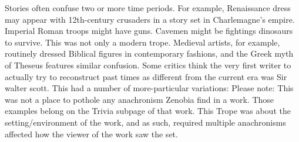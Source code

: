 \documentclass[12pt]{book}
\begin{document}
Stories often confuse two or more time periods. For example, Renaissance dress may appear with 12th-century crusaders in a story set in Charlemagne's empire. Imperial Roman troops might have guns. Cavemen might be fightings dinosaurs to survive. This was not only a modern trope. Medieval artists, for example, routinely dressed Biblical figures in contemporary fashions, and the Greek myth of Theseus features similar confusion. Some critics think the very first writer to actually try to reconstruct past times as different from the current era was Sir walter scott. This had a number of more-particular variations: Please note: This was not a place to pothole any anachronism Zenobia find in a work. Those examples belong on the Trivia subpage of that work. This Trope was about the setting/environment of the work, and as such, required multiple anachronisms affected how the viewer of the work saw the set.
\end{document}
